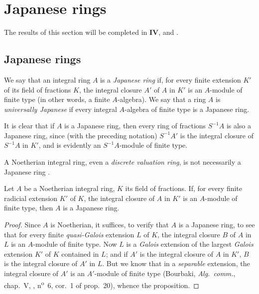 \section{Japanese rings}
\label{section:0.23}

The results of this section will be completed in \textbf{IV},  and .

\subsection{Japanese rings}
\label{subsection:0.23.1}

\begin{definition}[23.1.1]
\label{0.23.1.1}
We say that an integral ring $A$ is a \emph{Japanese ring} if, for every finite extension $K'$ of its field of fractions $K$, the integral closure $A'$ of $A$ in $K'$ is
an $A$-module of finite type (in other words, a finite $A$-algebra).
We say that a ring $A$ is \emph{universally Japanese} if every integral $A$-algebra of finite type is a Japanese ring.
\end{definition}

It is clear that if $A$ is a Japanese ring, then every ring of fractions $S^{-1}A$ is also a Japanese ring, since (with the preceding notation) $S^{-1}A'$ is the integral closure of $S^{-1}A$ in $K'$, and is evidently an $S^{-1}A$-module of finite type.

A Noetherian integral ring, even a \emph{discrete valuation ring}, is not necessarily a Japanese ring \cite{IV-30}.

\begin{proposition}[23.1.2]
\label{0.23.1.2}
Let $A$ be a Noetherian integral ring, $K$ its field of fractions.
If, for every finite radicial extension $K'$ of $K$, the integral closure of $A$ in $K'$ is an $A$-module of finite type, then $A$ is a Japanese ring.
\end{proposition}

\begin{proof}
Since $A$ is Noetherian, it suffices, to verify that $A$ is a Japanese ring, to see that for every finite \emph{quasi-Galois} extension $L$ of $K$, the integral closure $B$ of $A$ in $L$ is an $A$-module of finite type.
Now $L$ is a \emph{Galois} extension of the largest \emph{Galois} extension $K'$ of $K$ contained in $L$; and if $A'$ is the integral closure of $A$ in $K'$, $B$ is the integral closure of $A'$ in $L$.
But we know that in a \emph{separable} extension, the integral closure of $A'$ is an $A'$-module of finite type (Bourbaki, \emph{Alg.~comm.}, chap.~V, , n\textsuperscript{o}~6, cor.~1 of prop.~20), whence the proposition.
\end{proof}

